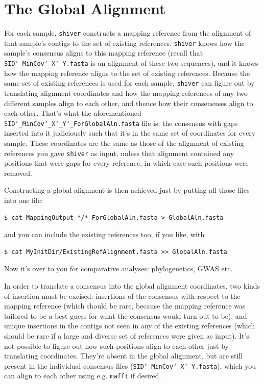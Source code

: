 \documentclass{article}
\newcommand{\shiv}{\c{shiver}\xspace}
\let\c\texttt
\begin{document}
\section{The Global Alignment} \label{sec:GlobalAln}


For each sample, \shiv constructs a mapping reference from the alignment of that sample's contigs to the set of existing references.
\shiv knows how the sample's consensus aligns to this mapping reference (recall that \c{SID\char`_MinCov\char`_X\char`_Y.fasta} is an alignment of these two sequences), and it knows how the mapping reference aligns to the set of existing references.
Because the same set of existing references is used for each sample, \shiv can figure out by translating alignment coordinates and how the mapping references of any two different samples align to each other, and thence how their consensuses align to each other.
That's what the aforementioned \c{SID\char`_MinCov\char`_X\char`_Y\char`_ForGlobalAln.fasta} file is: the consensus with gaps inserted into it judiciously such that it's in the same set of coordinates for every sample.
These coordinates are the same as those of the alignment of existing references you gave \shiv as input, unless that alignment contained any positions that were gaps for every reference, in which case such positions were removed.

Constructing a global alignment is then achieved just by putting all those files into one file:
\begin{Verbatim}[samepage=true]
$ cat MappingOutput_*/*_ForGlobalAln.fasta > GlobalAln.fasta
\end{Verbatim}
and you can include the existing references too, if you like, with
\begin{Verbatim}[samepage=true]
$ cat MyInitDir/ExistingRefAlignment.fasta >> GlobalAln.fasta
\end{Verbatim}
Now it's over to you for comparative analyses: phylogenetics, GWAS etc.

In order to translate a consensus into the global alignment coordinates, two kinds of insertion must be excised: insertions of the consensus with respect to the mapping reference (which should be rare, because the mapping reference was tailored to be a best guess for what the consensus would turn out to be), and unique insertions in the contigs not seen in any of the existing references (which should be rare if a large and diverse set of references were given as input).
It's not possible to figure out how such positions align to each other just by translating coordinates.
They're absent in the global alignment, but are still present in the individual consensus files (\c{SID\char`_MinCov\char`_X\char`_Y.fasta}), which you can align to each other using e.g. \c{mafft} if desired.
\end{document}
